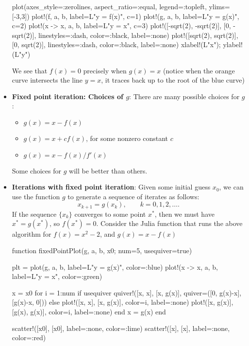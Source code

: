 \documentclass{report}
\begin{document}
\begin{itemize}
\begin{jlcode}
plot(axes_style=:zerolines, aspect_ratio=:equal, legend=:topleft, ylims=[-3,3])
plot!(f, a, b, label=L"y = f(x)", c=1)
plot!(g, a, b, label=L"y = g(x)", c=2)
plot!(x -> x, a, b, label=L"y = x", c=3)
plot!([-sqrt(2), -sqrt(2)], [0, -sqrt(2)], linestyles=:dash, color=:black, label=:none)
plot!([sqrt(2), sqrt(2)], [0, sqrt(2)], linestyles=:dash, color=:black, label=:none)
xlabel!(L"x"); ylabel!(L"y")
    \end{jlcode}
    \bigbreak \noindent 
    \bigbreak \noindent 
    We see that $f(x) = 0$ precisely  when $g(x) = x$ (notice when the orange curve intersects the line $y=x$, it traces back up to the root of the blue curve)
\item \textbf{Fixed point iteration: Choices of $g$}:
    There are many possible choices for $g$:
    \begin{itemize}
        \item $g(x) = x - f(x)$
        \item $g(x) = x + cf(x)$, for some nonzero constant $c$
        \item $g(x) = x - f(x)\big/f'(x)$
    \end{itemize}
Some choices for $g$ will be better than others.
\item \textbf{Iterations with fixed point iteration}:
    Given some initial guess $x_0$, we can use the function $g$ to generate a sequence of iterates as follows:
    $$x_{k+1} = g(x_{k}), \qquad k = 0, 1, 2, \ldots.$$
    If the sequence $\{x_k\}$ converges to some point $x^*$, then we must have $x^* = g(x^*)$, so $f(x^*) = 0$.
    \bigbreak \noindent 
    Consider the Julia function that runs the above algorithm for $f(x) = x^{2} - 2$, and $g(x) = x-f(x) $
    \bigbreak \noindent 
    \begin{jlcode}
function fixedPointPlot(g, a, b, x0; num=5, usequiver=true)

    plt = plot(g, a, b, label=L"y = g(x)", color=:blue)
    plot!(x -> x, a, b, label=L"y = x", color=:green)
    
    x = x0
    for i = 1:num
        if usequiver
            quiver!([x, x], [x, g(x)],
                quiver=([0, g(x)-x], [g(x)-x, 0]))
        else
            plot!([x, x], [x, g(x)], color=i, label=:none)
            plot!([x, g(x)], [g(x), g(x)], color=i, label=:none)
        end
        x = g(x)
    end
    
    scatter!([x0], [x0], label=:none, color=:lime)
    scatter!([x], [x], label=:none, color=:red)
    

\end{jlcode}
\end{itemize}
\end{document}
